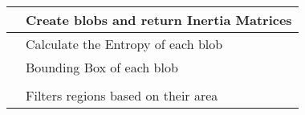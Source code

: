 \begin{table}[h!]
\begin{tabularx}{\linewidth}{|l|Y|}
     & Create blobs and return Inertia Matrices  \\
    \hline
                       & Calculate the Entropy of each blob  \\
    \hline
                      & Bounding Box of each blob  \\
             &  \\
    \hline
                 & Filters regions based on their area  \\
    \hline
  \end{tabularx}
\end{table}
